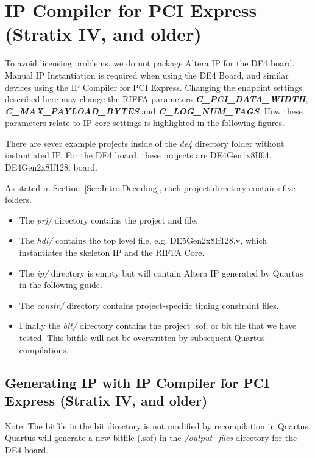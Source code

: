 \documentclass{refrep}
\newcommand{\Directory}[1]{\textit{#1}}
\newcommand{\Altera}[1]{{\color{blue}{#1}}}
\newcommand{\RIFFAParameter}[1]{\textit{\textbf{#1}}}
\begin{document}
\section{IP Compiler for PCI Express (Stratix IV, and older)}
\label{Sec:Altera:IPCompiler}
To avoid licensing problems, we do not package Altera IP for the DE4
board. Manual IP Instantiation is required when using the DE4 Board, and similar
devices using the IP Compiler for PCI Express. Changing the endpoint settings
described here may change the RIFFA para\-meters
\RIFFAParameter{C\_PCI\_DATA\_WIDTH}, \RIFFAParameter{C\_MAX\_PAYLOAD\_BYTES}
and \RIFFAParameter{C\_LOG\_NUM\_TAGS}. How these parameters relate to IP core
settings is highlighted in the following figures.

There are sever example projects inside of the \Directory{de4} directory folder
without instantiated IP. For the DE4 board, these
projects are DE4Gen1x8If64, DE4Gen2x8If128.%
board.

As stated in Section~\ref{Sec:Intro:Decoding}, each project directory contains
five folders.
\begin{itemize}
\item The \Directory{prj/} directory contains the project \Altera{.qpf} and \Altera{.qsf} file.
\item The \Directory{hdl/} contains the top level file, e.g. DE5Gen2x8If128.v,
  which instantiates the skeleton IP and the RIFFA Core.
\item The \Directory{ip/} directory is empty but will contain Altera IP generated by Quartus
  in the following guide.
\item The \Directory{constr/} directory contains project-specific timing constraint files.
\item Finally the \Directory{bit/} directory contains the project .sof, or bit
  file that we have tested. This bitfile will not be overwritten by subsequent
  Quartus compilations.
\end{itemize}

\subsection{Generating IP with IP Compiler for PCI Express (Stratix IV, and older)}
\label{Sec:Altera:IPCompiler:Generating}
Note: The bitfile in the bit directory is not modified by recompilation in
Quartus. Quartus will generate a new bitfile (.sof) in the
\Directory{/output\_files} directory for the DE4 board.
\end{document}
